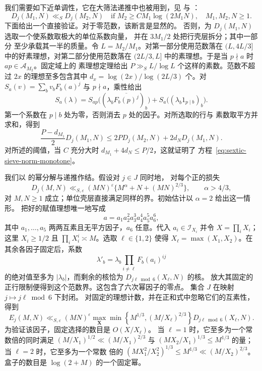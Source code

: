 我们需要如下近单调性，它在大筛法递推中也被用到，见 \cite[引理~4.4 和注记~5]{GL} 与
\cite[引理~3.1]{BGL}：
\begin{equation}\label{eq:sextic-sieve-norm-monotone}
 D_j(M_1,N)\ll_S D_j(M_2,N)
 \quad\text{if }M_2\ge C M_1\log(2M_1N),\quad M_1,M_2,N\ge1.
\end{equation}
下面给出一个直接验证。对于零范数，该断言是显然的。
否则，为 $D_j(M_1,N)$ 选取一个使系数取极大的单位系数向量，
并在 $3M_1/2$ 处把行壳层拆分；其中一部分
至少承载其一半的质量。令 $L=M_2/M_1$。对第一部分使用范数落在
$(L,4L/3]$ 中的好素理想，对第二部分使用范数落在
$(2L/3,L]$ 中的素理想。于是当 $p\nmid a$ 时 $ap\in\mathcal A_{M_2}$。固定域上的
素理想定理给出 $P\gg_S L/\log L$ 个这样的素数。范数不超过 $2x$ 的理想至多包含其中
$d_x=\log(2x)/\log(2L/3)$ 个。对
$S_a(v)=\sum_bv_bF_b(a)^j$ 与 $p\nmid a$，乘性给出
\[
 S_a(\lambda)=S_{ap}\bigl((\lambda_b\overline{F_b(p)^j})_b\bigr)
                  +S_a\bigl((\lambda_b1_{p\mid b})_b\bigr).
\]
第一个系数在 $p\mid b$ 处为零，否则消去 $p$ 处的因子。对所选取的行与
素数取平方并求和，得到
\[
 \frac{P-d_{M_1}}2D_j(M_1,N)
 \le2P D_j(M_2,N)+2d_ND_j(M_1,N).
\]
对所述的阈值，当 $C$ 充分大时
$d_{M_1}+4d_N\le P/2$，这就证明了
方程~\eqref{eq:sextic-sieve-norm-monotone}。

我们以 \cite[引理~3.4--3.5]{BGL} 的幂分解与递推作结。假设对 $j\in J$ 同时地，
对每个正的损失
\begin{equation}\label{eq:sextic-sieve-inductive-bound}
 D_j(M,N)\ll_{S,\varepsilon}(MN)^\varepsilon
       \{M^\alpha+N+(MN)^{2/3}\},\qquad \alpha>4/3,
\end{equation}
对 $M,N\ge1$ 成立；单位壳层直接满足同样的界。初始估计以 $\alpha=2$ 给出这一情形。
把好的赋值理想唯一地写成
\[
 a=a_1a_2^2a_3^3a_4^4a_5^5a_6^6,
\]
其中 $a_1,\ldots,a_5$ 两两互素且无平方因子，$a_6$ 任意。代入
$a_i\in\mathcal I_{X_i}$ 并令 $X=\prod_iX_i$；这里 $X_i\ge1/2$ 且
$\prod_iX_i^i\asymp M$。选取 $\ell\in\{1,2\}$ 使得
$X_\ell=\max(X_1,X_2)$。在其余各因子固定后，系数
\[
 \lambda'_b=\lambda_b\prod_{i\ne\ell}F_b(a_i)^{ij}
\]
的绝对值至多为 $|\lambda_b|$，而剩余的核恰为 $D_{j\ell\bmod6}(X_\ell,N)$ 的核。
放大其固定的正行限制便得到这个范数界。这包含了六次幂因子的零点。
集合 $J$ 在映射 $j\mapsto j\ell\bmod6$ 下封闭。
对固定的理想计数，并在正和式中忽略它们的互素性，得到
\begin{equation}\label{eq:sextic-sieve-norm-power}
 E_j(M,N)\ll_{S,\varepsilon}(MN)^\varepsilon
 \max_{\boldsymbol X}
 \min\left\{M^{1/3},(M/X_\ell)^{2/3}\right\}
             D_{j\ell\bmod6}(X_\ell,N).
\end{equation}
为验证该因子，固定选择的数目是 $O(X/X_\ell)$。
当 $\ell=1$ 时，它至多为一个常数倍的同时满足
$(M/X_1)^{1/2}\ll(M/X_1)^{2/3}$ 与
$(MX_2/X_1)^{1/3}\le M^{1/3}$ 的量；当 $\ell=2$ 时，它至多为一个常数
倍的 $(MX_1^2/X_2^2)^{1/3}\le M^{1/3}\ll(M/X_2)^{2/3}$。
盒子的数目是 $\log(2+M)$ 的一个固定幂。


